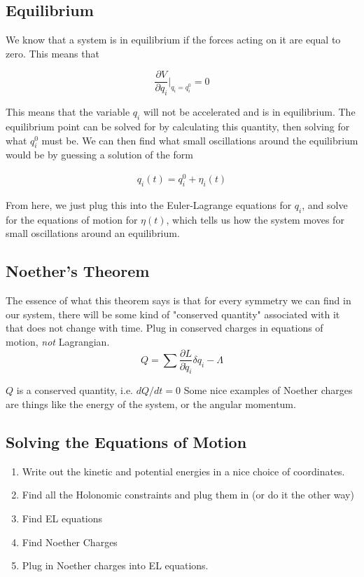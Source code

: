 \subsection{Equilibrium}

We know that a system is in equilibrium if the forces acting on it are equal to zero. This means that

$$\frac{\partial V}{\partial q_i}|_{q_i=q_i^0} = 0$$

This means that the variable $q_i$ will not be accelerated and is in equilibrium. The equilibrium point can be solved for by calculating this quantity, then solving for what $q_i^0$ must be. We can then find what small oscillations around the equilibrium would be by guessing a solution of the form 

\begin{align}
q_i(t) = q_i^0 + \eta_i(t)  
\end{align}

From here, we just plug this into the Euler-Lagrange equations for $q_i$, and solve for the equations of motion for $\eta(t)$, which tells us how the system moves for small oscillations around an equilibrium.

\subsection{Noether's Theorem}
The essence of what this theorem says is that for every symmetry we can find in our system, there will be some kind of "conserved quantity" associated with it that does not change with time.
Plug in conserved charges in equations of motion, \emph{not} Lagrangian.
$$Q = \sum\frac{\partial L}{\partial\dot{q}_i}\delta q_i - \Lambda$$

$Q$ is a conserved quantity, i.e. $dQ/dt = 0$
Some nice examples of Noether charges are things like the energy of the system, or the angular momentum. 



\subsection{Solving the Equations of Motion}
\begin{enumerate}
    \item Write out the kinetic and potential energies in a nice choice of coordinates.
    \item Find all the Holonomic constraints and plug them in (or do it the other way)
    \item Find EL equations
    \item Find Noether Charges
    \item Plug in Noether charges into EL equations.
\end{enumerate}


